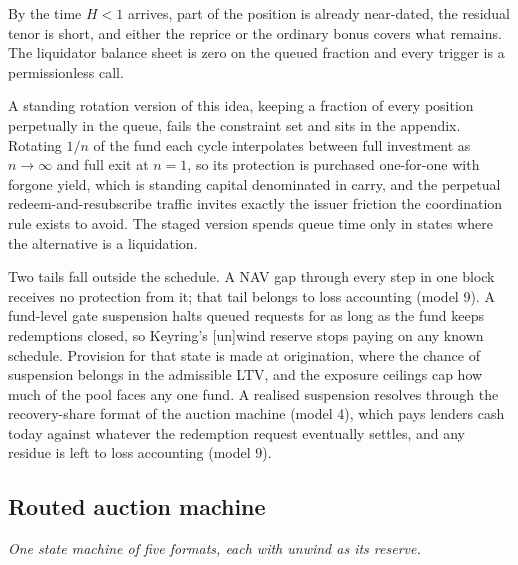 \documentclass[11pt,a4paper]{article}
\newcommand{\model}[2]{\subsection{#1}\noindent\textit{#2}\medskip}
\begin{document}
By the time $H < 1$ arrives, part of the position is already near-dated, the residual tenor is short, and either the reprice or the ordinary bonus covers what remains. The liquidator balance sheet is zero on the queued fraction and every trigger is a permissionless call.

A standing rotation version of this idea, keeping a fraction of every position perpetually in the queue, fails the constraint set and sits in the appendix. Rotating $1/n$ of the fund each cycle interpolates between full investment as $n \to \infty$ and full exit at $n = 1$, so its protection is purchased one-for-one with forgone yield, which is standing capital denominated in carry, and the perpetual redeem-and-resubscribe traffic invites exactly the issuer friction the coordination rule exists to avoid. The staged version spends queue time only in states where the alternative is a liquidation.

Two tails fall outside the schedule. A NAV gap through every step in one block receives no protection from it; that tail belongs to loss accounting (model 9). A fund-level gate suspension halts queued requests for as long as the fund keeps redemptions closed, so Keyring's [un]wind reserve stops paying on any known schedule. Provision for that state is made at origination, where the chance of suspension belongs in the admissible LTV, and the exposure ceilings cap how much of the pool faces any one fund. A realised suspension resolves through the recovery-share format of the auction machine (model 4), which pays lenders cash today against whatever the redemption request eventually settles, and any residue is left to loss accounting (model 9).

\model{Routed auction machine}{One state machine of five formats, each with unwind as its reserve.}
\end{document}
